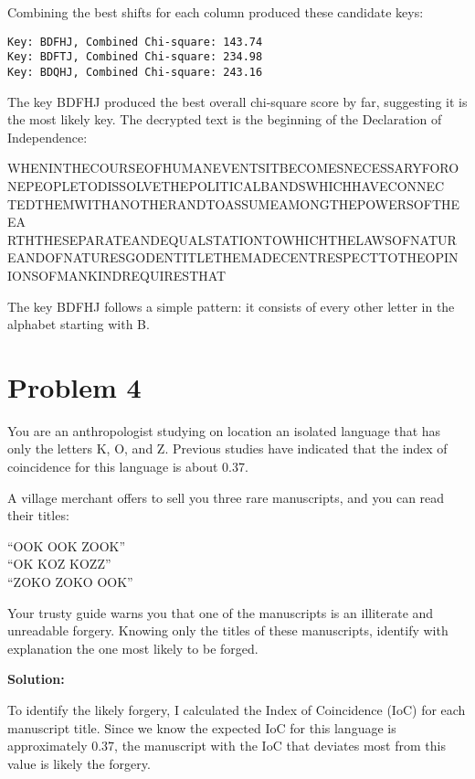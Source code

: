 \documentclass[12pt]{article}
\begin{document}
\vspace{1em}
Combining the best shifts for each column produced these candidate keys:
\begin{verbatim}
Key: BDFHJ, Combined Chi-square: 143.74
Key: BDFTJ, Combined Chi-square: 234.98
Key: BDQHJ, Combined Chi-square: 243.16
\end{verbatim}

The key BDFHJ produced the best overall chi-square score by far, suggesting it is the most likely key. The decrypted text is the beginning of the Declaration of Independence:

\begin{center}
    WHENINTHECOURSEOFHUMANEVENTSITBECOMESNECESSARYFORO
    NEPEOPLETODISSOLVETHEPOLITICALBANDSWHICHHAVECONNEC
    TEDTHEMWITHANOTHERANDTOASSUMEAMONGTHEPOWERSOFTHEEA
    RTHTHESEPARATEANDEQUALSTATIONTOWHICHTHELAWSOFNATUR
    EANDOFNATURESGODENTITLETHEMADECENTRESPECTTOTHEOPIN
    IONSOFMANKINDREQUIRESTHAT
\end{center}

\vspace{1em}
The key BDFHJ follows a simple pattern: it consists of every other letter in the alphabet starting with B.

\newpage
\section*{Problem 4}
You are an anthropologist studying on location an isolated language that has only the letters K, O, and Z. Previous studies have indicated that the index of coincidence for this language is about 0.37.

A village merchant offers to sell you three rare manuscripts, and you can read their titles:

\begin{center}
``OOK OOK ZOOK''\\
``OK KOZ KOZZ''\\
``ZOKO ZOKO OOK''
\end{center}

Your trusty guide warns you that one of the manuscripts is an illiterate and unreadable forgery. Knowing only the titles of these manuscripts, identify with explanation the one most likely to be forged.

\vspace{1em}
\textbf{Solution:}

To identify the likely forgery, I calculated the Index of Coincidence (IoC) for each manuscript title. Since we know the expected IoC for this language is approximately 0.37, the manuscript with the IoC that deviates most from this value is likely the forgery.
\end{document}
